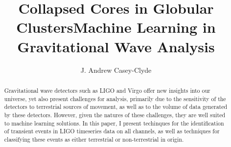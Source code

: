 \documentclass{article}
\title{Collapsed Cores in Globular Clusters}
\begin{document}

\title{Machine Learning in Gravitational Wave Analysis}
\author{J. Andrew Casey-Clyde}
\maketitle





\begin{abstract}
Gravitational wave detectors such as LIGO and Virgo offer new insights into our universe, yet also present challenges for analysis, primarily due to the sensitivity of the detectors to terrestrial sources of movement, as well as to the volume of data generated by these detectors. However, given the natures of these challenges, they are well suited to machine learning solutions. In this paper, I present techinques for the identification of transient events in LIGO timeseries data on all channels, as well as techniques for classifying these events as either terrestrial or non-terrestrial in origin. 
\end{abstract}


\end{document}

